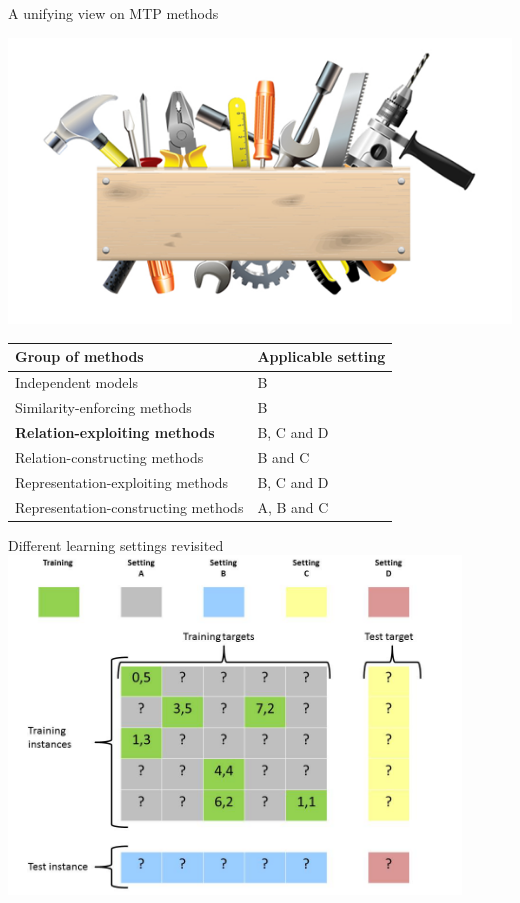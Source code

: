 \documentclass[]{beamer}
\renewcommand{\alert}[1]{\textbf{\color{putblue} #1}}
\begin{document}
\begin{frame}{A unifying view on MTP methods}

\begin{center}
\includegraphics[scale=0.3]{pics/tools}

\begin{tabular}{ll}
\hline
Group of methods & Applicable setting \\
\hline
\hline
Independent models & B \\
Similarity-enforcing methods & B   \\ 
\alert{Relation-exploiting methods} & B, C and D  \\
Relation-constructing methods & B and C \\
Representation-exploiting methods & B, C and D \\
Representation-constructing methods & A, B and C \\
\hline  
\end{tabular}
\end{center}
\end{frame}

\begin{frame}{Different learning settings revisited}
   \center
	\vspace{0.4cm}
   \includegraphics[width=0.9\textwidth]{Figures/pictures/Slide16} %
\end{frame}
\end{document}
